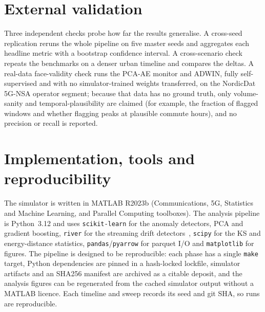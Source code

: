 \section{External validation}
\label{sec:external}

Three independent checks probe how far the results generalise. A cross-seed
replication reruns the whole pipeline on five master seeds and aggregates each
headline metric with a bootstrap confidence interval. A cross-scenario check
repeats the benchmarks on a denser urban timeline and compares the deltas. A
real-data face-validity check runs the PCA-AE monitor and ADWIN, fully
self-supervised and with no simulator-trained weights transferred, on the
NordicDat 5G-NSA operator segment; because that data has no ground truth, only
volume-sanity and temporal-plausibility are claimed (for example, the fraction
of flagged windows and whether flagging peaks at plausible commute hours), and
no precision or recall is reported.

\section{Implementation, tools and reproducibility}
\label{sec:tools}

The simulator is written in MATLAB R2023b (Communications, 5G, Statistics and
Machine Learning, and Parallel Computing toolboxes). The analysis pipeline is
Python~3.12 and uses \texttt{scikit-learn} for the anomaly detectors, PCA and
gradient boosting, \texttt{river} for the streaming drift
detectors~\cite{montiel2021river}, \texttt{scipy} for the KS and energy-distance
statistics, \texttt{pandas}/\texttt{pyarrow} for parquet I/O and
\texttt{matplotlib} for figures. The pipeline is designed to be reproducible:
each phase has a single \texttt{make} target, Python dependencies are pinned in a
hash-locked lockfile, simulator artifacts and an SHA256 manifest are archived as
a citable deposit, and the analysis figures can be regenerated from the cached
simulator output without a MATLAB licence. Each timeline and sweep records its
seed and git SHA, so runs are reproducible.
